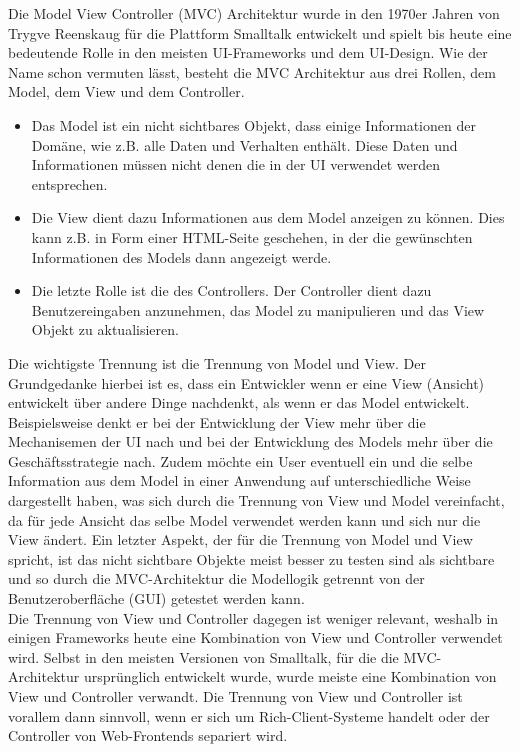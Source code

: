 Die Model View Controller (MVC) Architektur wurde in den 1970er Jahren von Trygve Reenskaug für die Plattform Smalltalk entwickelt und spielt bis heute eine bedeutende Rolle in den meisten UI-Frameworks und dem UI-Design.
Wie der Name schon vermuten lässt, besteht die MVC Architektur aus drei Rollen, dem Model, dem View und dem Controller.
\begin{itemize}
\item Das Model ist ein nicht sichtbares Objekt, dass einige Informationen der Domäne, wie z.B. alle Daten und Verhalten enthält. Diese Daten und Informationen müssen nicht denen die in der UI verwendet werden entsprechen.

\item Die View dient dazu Informationen aus dem Model anzeigen zu können. Dies kann z.B. in Form einer HTML-Seite geschehen, in der die gewünschten Informationen des Models dann angezeigt werde.

\item Die letzte Rolle ist die des Controllers. Der Controller dient dazu Benutzereingaben anzunehmen, das Model zu manipulieren und das View Objekt zu aktualisieren.
\end{itemize}
Die wichtigste Trennung ist die Trennung von Model und View. Der Grundgedanke hierbei ist es, dass ein Entwickler wenn er eine View (Ansicht) entwickelt über andere Dinge nachdenkt, als wenn er das Model entwickelt. Beispielsweise denkt er bei der Entwicklung der View mehr über die Mechanisemen der UI nach und bei der Entwicklung des Models mehr über die Geschäftsstrategie nach. Zudem möchte ein User eventuell ein und die selbe Information aus dem Model in einer Anwendung auf unterschiedliche Weise dargestellt haben, was sich durch die Trennung von View und Model vereinfacht, da für jede Ansicht das selbe Model verwendet werden kann und sich nur die View ändert. Ein letzter Aspekt, der für die Trennung von Model und View spricht, ist das nicht sichtbare Objekte meist besser zu testen sind als sichtbare und so durch die MVC-Architektur die Modellogik getrennt von der Benutzeroberfläche (GUI) getestet werden kann.\\
Die Trennung von View und Controller dagegen ist weniger relevant, weshalb in einigen Frameworks heute eine Kombination von View und Controller verwendet wird. Selbst in den meisten Versionen von Smalltalk, für die die MVC-Architektur ursprünglich entwickelt wurde, wurde meiste eine Kombination von View und Controller verwandt. Die Trennung von View und Controller ist vorallem dann sinnvoll, wenn er sich um Rich-Client-Systeme handelt oder der Controller von Web-Frontends separiert wird.\\
